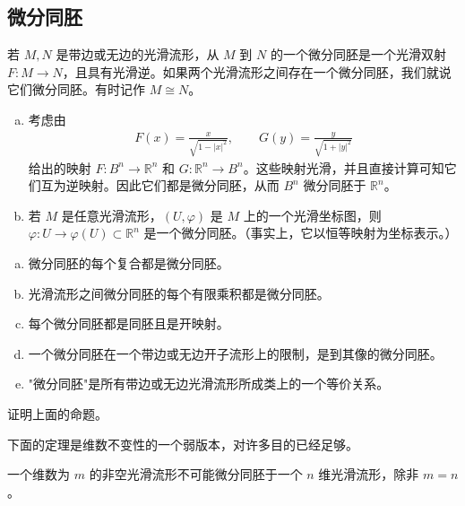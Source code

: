 \documentclass[../../main.tex]{subfiles}
\begin{document}
\subsection{微分同胚}\label{subsection:ch02-微分同胚}

若 $M,N$ 是带边或无边的光滑流形，从 $M$ 到 $N$ 的一个微分同胚是一个光滑双射 $F:M\to N$，且具有光滑逆。如果两个光滑流形之间存在一个微分同胚，我们就说它们微分同胚。有时记作 $M\cong N$。

\begin{example}[微分同胚]\label{example:ch02-微分同胚}
\begin{enumerate}[(a)]
\item 考虑由
\begin{align}\label{align:ch02-Bn与Rn微分同胚}
F(x)=\frac{x}{\sqrt{1-|x|^{2}}},\qquad G(y)=\frac{y}{\sqrt{1+|y|^{2}}}
\end{align}
给出的映射 $F:B^{n}\to\mathbb{R}^{n}$ 和 $G:\mathbb{R}^{n}\to B^{n}$。这些映射光滑，并且直接计算可知它们互为逆映射。因此它们都是微分同胚，从而 $B^{n}$ 微分同胚于 $\mathbb{R}^{n}$。
\item 若 $M$ 是任意光滑流形，$(U,\varphi)$ 是 $M$ 上的一个光滑坐标图，则 $\varphi:U\to\varphi(U)\subset\mathbb{R}^{n}$ 是一个微分同胚。（事实上，它以恒等映射为坐标表示。）
\end{enumerate}
\end{example}

\begin{proposition}[微分同胚的性质]\label{proposition:ch02-微分同胚性质}
\begin{enumerate}[(a)]
\item 微分同胚的每个复合都是微分同胚。
\item 光滑流形之间微分同胚的每个有限乘积都是微分同胚。
\item 每个微分同胚都是同胚且是开映射。
\item 一个微分同胚在一个带边或无边开子流形上的限制，是到其像的微分同胚。
\item "微分同胚"是所有带边或无边光滑流形所成类上的一个等价关系。
\end{enumerate}
\end{proposition}

\begin{exercise}\label{exercise:ch02-2.16}
证明上面的命题。
\end{exercise}

下面的定理是维数不变性的一个弱版本，对许多目的已经足够。

\begin{theorem}[维数的微分同胚不变性]\label{theorem:ch02-维数微分同胚不变性}
一个维数为 $m$ 的非空光滑流形不可能微分同胚于一个 $n$ 维光滑流形，除非 $m=n$。
\end{theorem}
\end{document}

